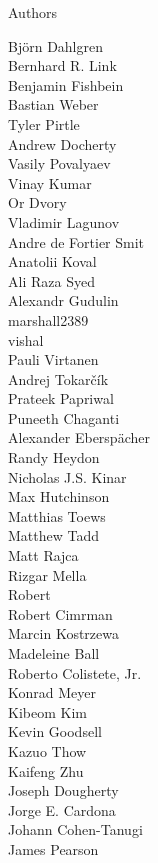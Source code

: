 \documentclass[xcolor=svgnames]{beamer}
\begin{document}
\begin{frame}{Authors}
\begin{multicols}{5}
    Björn Dahlgren\\
    Bernhard R. Link\\
    Benjamin Fishbein\\
    Bastian Weber\\
    Tyler Pirtle\\
    Andrew Docherty\\
    Vasily Povalyaev\\
    Vinay Kumar\\
    Or Dvory\\
    Vladimir Lagunov\\
    Andre de Fortier Smit\\
    Anatolii Koval\\
    Ali Raza Syed\\
    Alexandr Gudulin\\
    marshall2389\\
    vishal\\
    Pauli Virtanen\\
    Andrej Tokarčík\\
    Prateek Papriwal\\
    Puneeth Chaganti\\
    Alexander Eberspächer\\
    Randy Heydon\\
    Nicholas J.S. Kinar\\
    Max Hutchinson\\
    Matthias Toews\\
    Matthew Tadd\\
    Matt Rajca\\
    Rizgar Mella\\
    Robert\\
    Robert Cimrman\\
    Marcin Kostrzewa\\
    Madeleine Ball\\
    Roberto Colistete, Jr.\\
    Konrad Meyer\\
    Kibeom Kim\\
    Kevin Goodsell\\
    Kazuo Thow\\
    Kaifeng Zhu\\
    Joseph Dougherty\\
    Jorge E. Cardona\\
    Johann Cohen-Tanugi\\
    James Pearson\\
  \end{multicols}
\end{frame}
\end{document}
